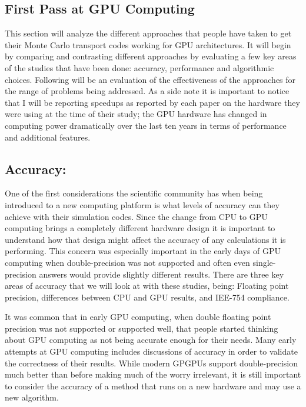 \subsection{ \textbf{First Pass at GPU Computing}}

This section will analyze the different approaches that people have taken to get their Monte Carlo transport codes working for GPU architectures.
%
It will begin by comparing and contrasting different approaches by evaluating a few key areas of the studies that have been done: accuracy, performance and algorithmic choices.
%
Following will be an evaluation of the effectiveness of the approaches for the range of problems being addressed.
%
As a side note it is important to notice that I will be reporting speedups as reported by each paper on the hardware they were using at the time of their study; the GPU hardware has changed in computing power dramatically over the last ten years in terms of performance and additional features.

\subsection*{ \textbf{Accuracy:} }

One of the first considerations the scientific community has when being introduced to a new computing platform is what levels of accuracy can they achieve with their simulation codes.
%
Since the change from CPU to GPU computing brings a completely different hardware design it is important to understand how that design might affect the accuracy of any calculations it is performing.
%
This concern was especially important in the early days of GPU computing when double-precision was not supported and often even single-precision answers would provide slightly different results.
%
There are three key areas of accuracy that we will look at with these studies, being: Floating point precision, differences between CPU and GPU results, and IEE-754 compliance.
%

%
It was common that in early GPU computing, when double floating point precision was not supported or supported well, that people started thinking about GPU computing as not being accurate enough for their needs.
%
Many early attempts at GPU computing includes discussions of accuracy in order to validate the correctness of their results.
%
While modern GPGPUs support double-precision much better than before making much of the worry irrelevant, it is still important to consider the accuracy of a method that runs on a new hardware and may use a new algorithm.
%


